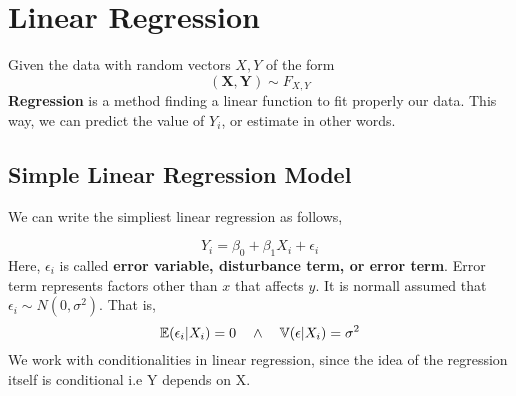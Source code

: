 \chapter{Linear Regression}
Given the data with random vectors $X,Y$ of the form
\[ (\mathbf{X}, \mathbf{Y}) \sim F_{X,Y}\]
\textbf{Regression} is a method finding a linear function to fit properly our data. This way, we can predict the value of $Y_i$, or estimate in other words.
\section{Simple Linear Regression Model}
\begin{definition}
We can write the simpliest linear regression as follows,

\[Y_i = \beta_0 + \beta_1X_i + \epsilon_i \]
Here, $\epsilon_i$ is called \textbf{error variable, disturbance term, or error term}. 
Error term represents factors other than $x$ that affects $y$.
It is normall assumed  that $\epsilon_i \sim N(0, \sigma^2)$. That is,
\[ {\mathbb{E}}(\epsilon_i | X_i) = 0 \quad \land \quad {\mathbb{V}}(\epsilon | X_i) = \sigma^2 \]
We work with conditionalities in linear regression, since the idea of the regression itself is conditional i.e Y depends on X.
\end{definition}

